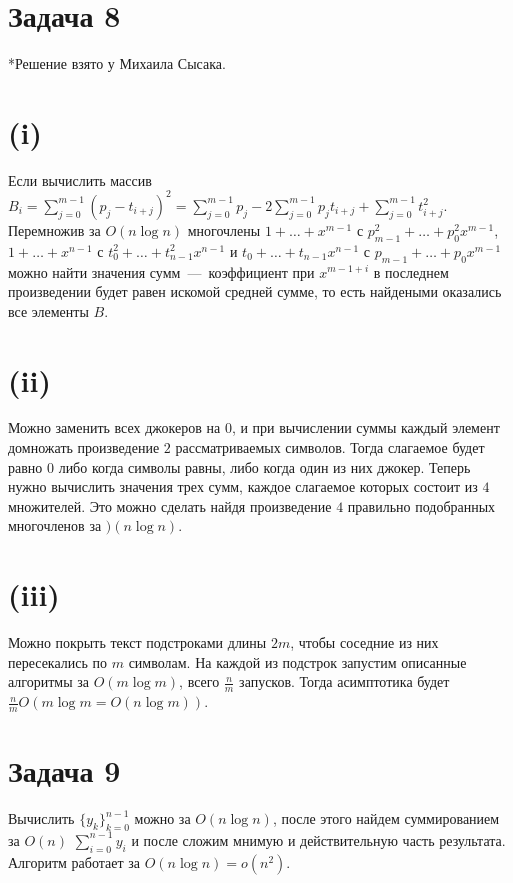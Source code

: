 \documentclass[a4paper,12pt]{article} %
\begin{document}
\section{Задача 8}
\hspace{5mm}
*Решение взято у Михаила Сысака.
\section{(i)}
\hspace{5mm}
Если вычислить массив $B_i=\sum\limits_{j=0}^{m-1}(p_j-t_{i+j})^2=\sum\limits_{j=0}^{m-1}p_j-2\sum\limits_{j=0}^{m-1}p_jt_{i+j}+\sum\limits_{j=0}^{m-1}t_{i+j}^2$. Перемножив за $O(n\log{n})$ многочлены $1+\ldots+x^{m-1}$ с $p_{m-1}^2+\ldots+p_0^2x^{m-1}$, $1+\ldots+x^{n-1}$ с $t_{0}^2+\ldots+t_{n-1}^2x^{n-1}$ и $t_0+\ldots+t_{n-1}x^{n-1}$ с $p_{m-1}+\ldots+p_0x^{m-1}$ можно найти значения сумм~---~коэффициент при $x^{m-1+i}$ в последнем произведении будет равен искомой средней сумме, то есть найдеными оказались все элементы $B$.

\section{(ii)}
\hspace{5mm}
Можно заменить всех джокеров на $0$, и при вычислении суммы каждый элемент домножать произведение $2$ рассматриваемых символов. Тогда слагаемое будет равно $0$ либо когда символы равны, либо когда один из них джокер. Теперь нужно вычислить значения трех сумм, каждое слагаемое которых состоит из $4$ множителей. Это можно сделать найдя произведение $4$ правильно подобранных многочленов за $)(n\log n)$.

\section{(iii)}
\hspace{5mm}
Можно покрыть текст подстроками длины $2m$, чтобы соседние из них пересекались по $m$ символам. На каждой из подстрок запустим описанные алгоритмы за $O(m\log{m})$, всего $\frac{n}{m}$ запусков. Тогда асимптотика будет $\frac{n}{m}O(m\log{m}=O(n\log{m}))$.





\section{Задача 9}
\hspace{5mm}
Вычислить $\{y_k\}_{k=0}^{n-1}$ можно за $O(n\log{n})$, после этого найдем суммированием за $O(n)$ $\sum\limits_{i=0}^{n-1}y_i$ и после сложим мнимую и действительную часть результата. Алгоритм работает за $O(n\log{n})=o(n^2)$.
\end{document}
